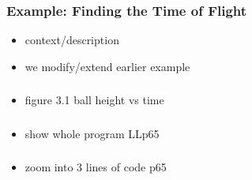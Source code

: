 \documentclass[english,14pt]{beamer}
\begin{document}
\begin{frame}[fragile]

\frametitle{Example: Finding the Time of Flight}

\begin{itemize}
	\item context/description
	\item we modify/extend earlier example
\end{itemize}


\end{frame}


\begin{frame}[fragile]

\frametitle{}

\begin{itemize}
	\item figure 3.1 ball height vs time
\end{itemize}

\end{frame}


\begin{frame}[fragile]

\frametitle{}

\begin{itemize}
	\item show whole program LLp65
\end{itemize}

\end{frame}


\begin{frame}[fragile]

\frametitle{}

\begin{itemize}
	\item zoom into 3 lines of code p65
\end{itemize}

\end{frame}
\end{document}
